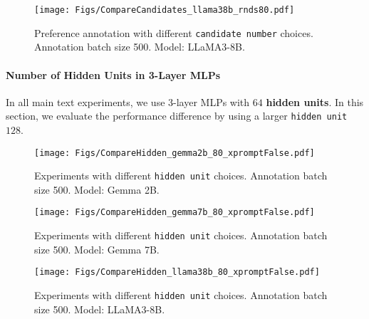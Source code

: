 
\begin{figure}[h!]
    \centering
    \texttt{[image: Figs/CompareCandidates\_llama38b\_rnds80.pdf]}
    \caption{\small Preference annotation with different \texttt{candidate number} choices. Annotation batch size 500. Model: LLaMA3-8B.}
    \label{fig:results_candidate_abs500_llama38b} 
\end{figure} 


\newpage
\paragraph{Number of Hidden Units in 3-Layer MLPs}
In all main text experiments, we use 3-layer MLPs with $64$ \textbf{hidden units}. In this section, we evaluate the performance difference by using a larger \texttt{hidden unit} $128$. 


\begin{figure}[h!]
    \centering
    \texttt{[image: Figs/CompareHidden\_gemma2b\_80\_xpromptFalse.pdf]}
    \caption{\small Experiments with different \texttt{hidden unit} choices. Annotation batch size 500. Model: Gemma 2B.}
    \label{fig:results_hidden_abs500_gemma2b} 
\end{figure} 


\begin{figure}[h!]
    \centering
    \texttt{[image: Figs/CompareHidden\_gemma7b\_80\_xpromptFalse.pdf]}
    \caption{\small Experiments with different \texttt{hidden unit} choices. Annotation batch size 500. Model: Gemma 7B.}
    \label{fig:results_hidden_abs500_gemma7b} 
\end{figure} 

\begin{figure}[h!]
    \centering
    \texttt{[image: Figs/CompareHidden\_llama38b\_80\_xpromptFalse.pdf]}
    \caption{\small Experiments with different \texttt{hidden unit} choices. Annotation batch size 500. Model: LLaMA3-8B.}
    \label{fig:results_hidden_abs500_llama38b} 
\end{figure} 



